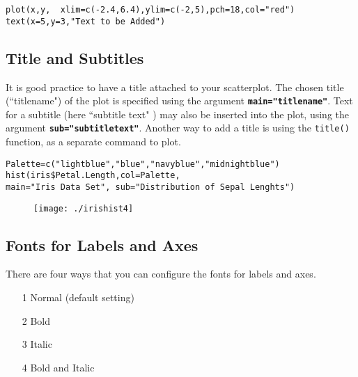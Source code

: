 \begin{framed}
\begin{verbatim}
plot(x,y,  xlim=c(-2.4,6.4),ylim=c(-2,5),pch=18,col="red")
text(x=5,y=3,"Text to be Added")
\end{verbatim}
\end{framed}




\subsection{Title and Subtitles}
It is good practice to have a title attached to your scatterplot. The chosen title (``titlename") of the plot is specified using the argument \texttt\textbf{{main="titlename"}}. Text for a subtitle (here ``subtitle text" ) may also be inserted into the plot, using the argument  \texttt\textbf{{sub="subtitletext"}}. Another way to add a title is using the \texttt{title()} function, as a separate command to plot.


\begin{framed}
\begin{verbatim}
Palette=c("lightblue","blue","navyblue","midnightblue")
hist(iris$Petal.Length,col=Palette,
main="Iris Data Set", sub="Distribution of Sepal Lenghts")
\end{verbatim}
\end{framed}


\begin{figure}
\centering
\texttt{[image: ./irishist4]}
\caption{}
\label{fig:irishist4}
\end{figure}


\subsection{Fonts for Labels and Axes}
There are four ways that you can configure the fonts for labels and axes.

\begin{itemize}
\item[1] Normal (default setting)
\item[2] Bold
\item[3] Italic
\item[4] Bold and Italic
\end{itemize}

